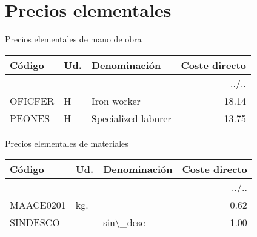 \documentclass{book}%
\begin{document}
%
\normalsize%
\part{Precios elementales}%
\label{sec:Precioselementales}%
\begin{center}
%
\Large%
 Precios elementales de mano de obra %
\normalsize%
\end{center}
%
\small%
\begin{longtable}{|l|l|p{4cm}|r|}%
\hline%
Código&Ud.&Denominación&Coste directo\\%
\hline%
\endhead%
\hline%
\multicolumn{4}{|r|}{../..}\\%
\hline%
\endfoot%
\hline%
\endlastfoot%
OFICFER&H&Iron worker&18.14\\%
PEONES&H&Specialized laborer&13.75\\%
\end{longtable}%
\normalsize%
\begin{center}
%
\Large%
 Precios elementales de materiales %
\normalsize%
\end{center}
%
\small%
\begin{longtable}{|l|l|p{4cm}|r|}%
\hline%
Código&Ud.&Denominación&Coste directo\\%
\hline%
\endhead%
\hline%
\multicolumn{4}{|r|}{../..}\\%
\hline%
\endfoot%
\hline%
\endlastfoot%
MAACE0201&kg.&&0.62\\%
SINDESCO&&sin\textbackslash{}\_desc&1.00\\%
\end{longtable}%
\normalsize

%
\end{document}
